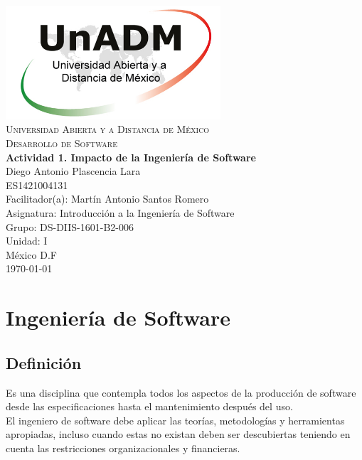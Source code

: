 \documentclass[spanish,12pt,letterpapper]{article}
\begin{document}
	\begin{titlepage}
		\begin{center}
			\includegraphics[width=0.6\textwidth]{../logoUnADM}~\\[1cm] 
			\textsc{Universidad Abierta y a Distancia de México}\\[0.8cm]
			\textsc{Desarrollo de Software}\\[1.8cm]
			
			\textbf{ \Large Actividad 1. Impacto de la Ingeniería de Software}\\[3cm]
			
			Diego Antonio Plascencia Lara\\ ES1421004131 \\[0.4cm]
			Facilitador(a): Martín Antonio Santos Romero\\
			Asignatura: Introducción a la Ingeniería de Software\\
			Grupo: DS-DIIS-1601-B2-006 \\
			Unidad: I \\
			
			\vfill México D.F\\{\today}
			
		\end{center}
	\end{titlepage}
	
	\section{Ingeniería de Software}
	\subsection{Definición}
	Es una disciplina que contempla todos los aspectos de la producción de software desde las especificaciones hasta el mantenimiento después del uso.\\
	
	El ingeniero de software debe aplicar las teorías, metodologías y herramientas apropiadas, incluso cuando estas no existan deben ser descubiertas teniendo en cuenta las restricciones organizacionales y financieras.\\
	
\end{document}
